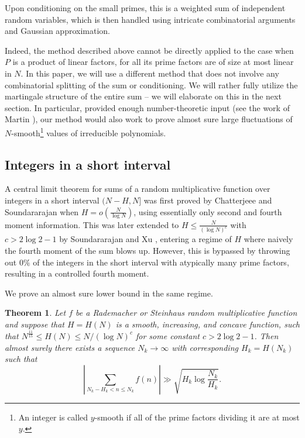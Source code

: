 \documentclass[11pt]{tran-l}
\newtheorem{theoremL}{Theorem}[section]    %
\theoremstyle{definition}
\theoremstyle{remark}
\numberwithin{equation}{section}
\begin{document}
Upon conditioning on the small primes, this is a weighted sum of independent random variables, which is then handled using intricate combinatorial arguments and Gaussian approximation. 

Indeed, the method described above cannot be directly applied to the case when $P$ is a product of linear factors, for all its prime factors are of size at most linear in $N$.
In this paper, we will use a different method that does not involve any combinatorial splitting of the sum or conditioning. We will rather fully utilize the martingale structure of the entire sum -- we will elaborate on this in the next section. In particular, provided enough number-theoretic input (see the work of Martin \cite{Martin2002}), our method would also work to prove almost sure large fluctuations of $N$-smooth\footnote{An integer is called $y$-smooth if all of the prime factors dividing it are at most $y$.} values of irreducible polynomials.

\subsection{Integers in a short interval} A central limit theorem for sums of a random multiplicative function over integers in a short interval $(N-H, N]$ was first proved by Chatterjeee and Soundararajan \cite{ChatterjeeSoundararajan2012} when $H=o\left(\frac{N}{\log N}\right)$, using essentially only second and fourth moment information. This was later extended to $H\leq \frac{N}{(\log N)^{c}}$ with $c>2\log2-1$ by Soundararajan and Xu \cite{soundararajan2023clt}, entering a regime of $H$ where naively the fourth moment of the sum blows up. However, this is bypassed by throwing out $0\%$ of the integers in the short interval with atypically many prime factors, resulting in a controlled fourth moment. 

We prove an almost sure lower bound in the same regime. 

\begin{theoremL}\label{thm:asBoundsShort}
    Let $f$ be a Rademacher or Steinhaus random multiplicative function and suppose that $H=H(N)$ is a smooth, increasing, and concave function, such that $N^{\frac{11}{15}}\leq H(N)\leq N/(\log N)^c$
    for some constant $c>2\log 2-1$. 
    Then almost surely there exists a sequence $N_k\to\infty$ with corresponding $H_k = H(N_k)$ such that 
    \begin{equation*}
        \left\lvert\sum_{N_k-H_k < n \leq N_k}f(n)\right\rvert\gg \sqrt{H_k\log\frac{N_k}{H_k}}.
    \end{equation*}
\end{theoremL}
\end{document}

